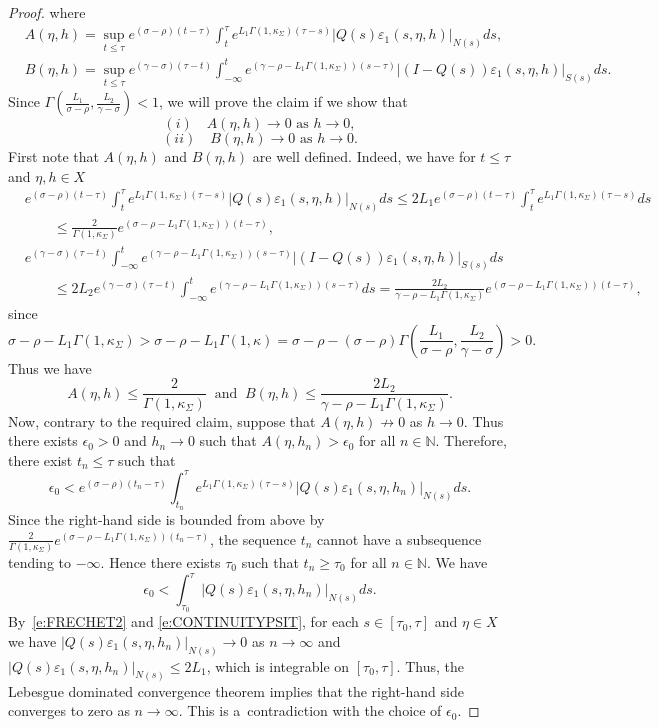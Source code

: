 \documentclass[a4paper,11pt,reqno]{amsart}
\theoremstyle{plain}
\theoremstyle{definition}
\numberwithin{equation}{section}
\newcommand{\N}{\mathbb{N}}
\newcommand{\eps}{\varepsilon}
\renewcommand{\geq}{\geqslant}
\renewcommand{\leq}{\leqslant}
\begin{document}
\begin{proof}
where
\begin{align*}
	& A(\eta,h)=\sup_{t\leq\tau}e^{(\sigma-\rho)(t-\tau)}\int_{t}^{\tau}e^{L_1\Gamma(1,\kappa_\Sigma)(\tau-s)}|Q(s)\eps_1(s,\eta,h)|_{N(s)}ds,\\
	& B(\eta,h)=\sup_{t\leq\tau}e^{(\gamma-\sigma)(\tau-t)}\int_{-\infty}^{t}e^{(\gamma-\rho-L_1\Gamma(1,\kappa_\Sigma))(s-\tau)}|(I-Q(s))\eps_1(s,\eta,h)|_{S(s)}ds.
\end{align*}
Since $\Gamma(\frac{L_1}{\sigma-\rho},\frac{L_2}{\gamma-\sigma})<1$, we will prove the claim if we show that
$$(i)\quad A(\eta,h)\to 0\text{ as }h\to 0,$$
$$(ii)\quad B(\eta,h)\to 0\text{ as }h\to 0.$$
First note that $A(\eta,h)$ and $B(\eta,h)$ are well defined. Indeed, we have for $t\leq\tau$ and $\eta,h\in X$
\begin{align*}
&e^{(\sigma-\rho)(t-\tau)}\int_{t}^{\tau}e^{L_1\Gamma(1,\kappa_\Sigma)(\tau-s)}|Q(s)\eps_1(s,\eta,h)|_{N(s)}ds
\leq 2L_1e^{(\sigma-\rho)(t-\tau)}\int_{t}^{\tau}e^{L_1\Gamma(1,\kappa_\Sigma)(\tau-s)}ds\\
&\qquad\leq \frac{2}{\Gamma(1,\kappa_\Sigma)}e^{(\sigma-\rho-L_1\Gamma(1,\kappa_\Sigma))(t-\tau)},\\
&e^{(\gamma-\sigma)(\tau-t)}\int_{-\infty}^{t}e^{(\gamma-\rho-L_1\Gamma(1,\kappa_\Sigma))(s-\tau)}|(I-Q(s))\eps_1(s,\eta,h)|_{S(s)}ds\\
&\qquad \leq 2L_2e^{(\gamma-\sigma)(\tau-t)}\int_{-\infty}^{t}e^{(\gamma-\rho-L_1\Gamma(1,\kappa_\Sigma))(s-\tau)}ds=\frac{2L_2}{\gamma-\rho-L_1\Gamma(1,\kappa_\Sigma)}e^{(\sigma-\rho-L_1\Gamma(1,\kappa_\Sigma))(t-\tau)},
\end{align*}
since 
$$\sigma-\rho-L_1\Gamma(1,\kappa_\Sigma)>\sigma-\rho-L_1\Gamma(1,\kappa)=\sigma-\rho-(\sigma-\rho)\Gamma\left(\frac{L_1}{\sigma-\rho},\frac{L_2}{\gamma-\sigma}\right)>0.$$
Thus we have
$$A(\eta,h)\leq\frac{2}{\Gamma(1,\kappa_\Sigma)}\ \text{ and }\ B(\eta,h)\leq \frac{2L_2}{\gamma-\rho-L_1\Gamma(1,\kappa_\Sigma)}.$$
Now, contrary to the required claim, suppose that $A(\eta,h)\not\to 0$ as $h\to 0$. Thus there exists $\epsilon_0>0$ and $h_n\to 0$ such that $A(\eta,h_n)>\epsilon_0$ for all $n\in\N$. Therefore, there exist $t_n\leq\tau$ such that 
$$\epsilon_0<e^{(\sigma-\rho)(t_n-\tau)}\int_{t_n}^{\tau}e^{L_1\Gamma(1,\kappa_\Sigma)(\tau-s)}|Q(s)\eps_1(s,\eta,h_n)|_{N(s)}ds.$$
Since the right-hand side is bounded from above by $\frac{2}{\Gamma(1,\kappa_\Sigma)}e^{(\sigma-\rho-L_1\Gamma(1,\kappa_\Sigma))(t_n-\tau)}$,
the sequence $t_n$ cannot have a subsequence tending to $-\infty$. Hence there exists $\tau_0$ such that $t_n\geq\tau_0$ for all $n\in\N$.
We have
$$\epsilon_0<\int_{\tau_0}^{\tau}|Q(s)\eps_1(s,\eta,h_n)|_{N(s)}ds.$$
By~\eqref{e:FRECHET2} and \eqref{e:CONTINUITYPSIT}, for each $s\in[\tau_0,\tau]$ and $\eta\in X$ we have $|Q(s)\eps_1(s,\eta,h_n)|_{N(s)}\to 0$ as $n\to\infty$ and $|Q(s)\eps_1(s,\eta,h_n)|_{N(s)}\leq 2L_1$, which is integrable on $[\tau_0,\tau]$. Thus, the Lebesgue dominated convergence theorem implies that the right-hand side converges to zero as $n\to\infty$. This is a~contradiction with the choice of $\epsilon_0$.


\end{proof}
\end{document}

